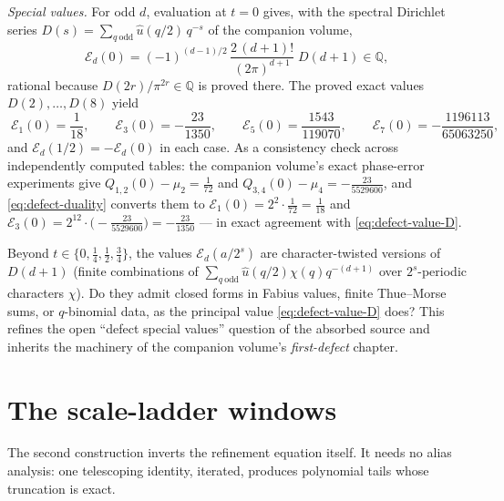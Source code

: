 \documentclass[11pt,oneside]{article}
\numberwithin{equation}{section}
\theoremstyle{definition}
\theoremstyle{remark}
\newcommand{\Q}{\mathbb Q}
\begin{document}
\emph{Special values.}  For odd $d$, evaluation at $t=0$ gives, with
the spectral Dirichlet series
$D(s)=\sum_{q\ \mathrm{odd}}\widehat u(q/2)\,q^{-s}$ of the companion
volume,
\begin{equation}
 \mathcal E_d(0)
 =(-1)^{(d-1)/2}\,
 \frac{2\,(d+1)!}{(2\pi)^{d+1}}\;D(d+1)\in\Q,
 \label{eq:defect-value-D}
\end{equation}
rational because $D(2r)/\pi^{2r}\in\Q$ is proved there.  The proved
exact values $D(2),\dots,D(8)$ yield
\begin{equation}
 \boxed{\;
 \mathcal E_1(0)=\frac1{18},\qquad
 \mathcal E_3(0)=-\frac{23}{1350},\qquad
 \mathcal E_5(0)=\frac{1543}{119070},\qquad
 \mathcal E_7(0)=-\frac{1196113}{65063250},
 \;}
 \label{eq:defect-values}
\end{equation}
and $\mathcal E_d(1/2)=-\mathcal E_d(0)$ in each case.  As a
consistency check across independently computed tables: the companion
volume's exact phase-error experiments give
$Q_{1,2}(0)-\mu_2=\tfrac1{72}$ and
$Q_{3,4}(0)-\mu_4=-\tfrac{23}{5529600}$, and
\eqref{eq:defect-duality} converts them to
$\mathcal E_1(0)=2^{2}\cdot\tfrac1{72}=\tfrac1{18}$ and
$\mathcal E_3(0)=2^{12}\cdot\bigl(-\tfrac{23}{5529600}\bigr)
=-\tfrac{23}{1350}$ --- in exact agreement with
\eqref{eq:defect-value-D}.

\begin{question}
\label{q:defect-values}
Beyond $t\in\{0,\tfrac14,\tfrac12,\tfrac34\}$, the values
$\mathcal E_d(a/2^{s})$ are character-twisted versions of $D(d+1)$
(finite combinations of
$\sum_{q\ \mathrm{odd}}\widehat u(q/2)\chi(q)q^{-(d+1)}$ over
$2^{s}$-periodic characters $\chi$).  Do they admit closed forms in
Fabius values, finite Thue--Morse sums, or $q$-binomial data, as the
principal value \eqref{eq:defect-value-D} does?  This refines the
open ``defect special values'' question of the absorbed source and
inherits the machinery of the companion volume's
\emph{first-defect} chapter.
\end{question}

\section{The scale-ladder windows}
\label{sec:ladder}

The second construction inverts the refinement equation itself.  It
needs no alias analysis: one telescoping identity, iterated, produces
polynomial tails whose truncation is exact.
\end{document}
